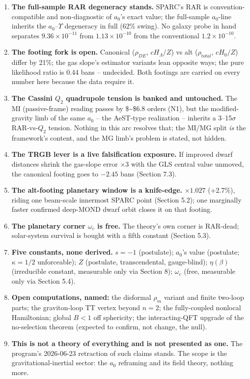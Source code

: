 \documentclass[
]{article}
\newcounter{none} %
\providecommand{\tightlist}{%
  \setlength{\itemsep}{0pt}\setlength{\parskip}{0pt}}
\begin{document}
\begin{enumerate}
\def\labelenumi{\arabic{enumi}.}
\tightlist
\item
  \textbf{The full-sample RAR degeneracy stands.} SPARC's RAR is
  convention-compatible and non-diagnostic of \(a_0\)'s exact value; the
  full-sample \(a_0\)-line inherits the \(a_0\)--\(\Upsilon\) degeneracy
  in full (62\% swing). No galaxy probe in hand separates
  \(9.36 \times 10^{-11}\) from \(1.13 \times 10^{-10}\) from the
  conventional \(1.2 \times 10^{-10}\).
\item
  \textbf{The footing fork is open.} Canonical (\(\rho_{DE}\),
  \(cH_\Lambda/Z\)) vs alt (\(\rho_{total}\), \(cH_0/Z\)) differ by
  21\%; the gas slope's estimator variants lean opposite ways; the pure
  likelihood ratio is 0.44 bans -- undecided. Both footings are carried
  on every number here because the data require it.
\item
  \textbf{The Cassini \(Q_2\) quadrupole tension is banked and
  untouched.} The MI (passive-frame) reading passes by \$\sim\$6.8
  orders (N1), but the modified-gravity limb of the same \(a_0\) -- the
  AeST-type realization -- inherits a 3--15\(\sigma\) RAR-vs-\(Q_2\)
  tension. Nothing in this arc resolves that; the MI/MG split \emph{is}
  the framework's content, and the MG limb's problem is stated, not
  hidden.
\item
  \textbf{The TRGB lever is a live falsification exposure.} If improved
  dwarf distances shrink the gas-slope error \(\times 3\) with the GLS
  central value unmoved, the canonical footing goes to \(-2.45\) bans
  (Section 7.3).
\item
  \textbf{The alt-footing planetary window is a knife-edge.}
  \(\times 1.027\) (+2.7\%), riding one beam-scale innermost SPARC point
  (Section 5.2); one marginally faster confirmed deep-MOND dwarf orbit
  closes it on that footing.
\item
  \textbf{The planetary corner \(\omega_c\) is free.} The theory's own
  corner is RAR-dead; solar-system survival is bought with a fifth
  constant (Section 5.3).
\item
  \textbf{Five constants, none derived.} \(s = -1\) (postulate);
  \(a_0\)'s value (postulate; \(\kappa = 1/2\) unforceable); \(Z\)
  (postulate, transcendental, gauge-blind); \(\eta(\beta)\) (irreducible
  constant, measurable only via Section 8); \(\omega_c\) (free,
  measurable only via Section 5.4).
\item
  \textbf{Open computations, named:} the disformal \(\rho_m\) variant
  and finite two-loop parts; the graviton-loop TT vertex beyond
  \(n = 2\); the fully-coupled nonlocal Hamiltonian; global \(B < 1\)
  off sphericity; the interacting-QFT upgrade of the no-selection
  theorem (expected to confirm, not change, the null).
\item
  \textbf{This is not a theory of everything and is not presented as
  one.} The program's 2026-06-23 retraction of such claims stands. The
  scope is the gravitational-inertial sector: the \(a_0\) reframing and
  its field theory, nothing more.
\end{enumerate}
\end{document}
